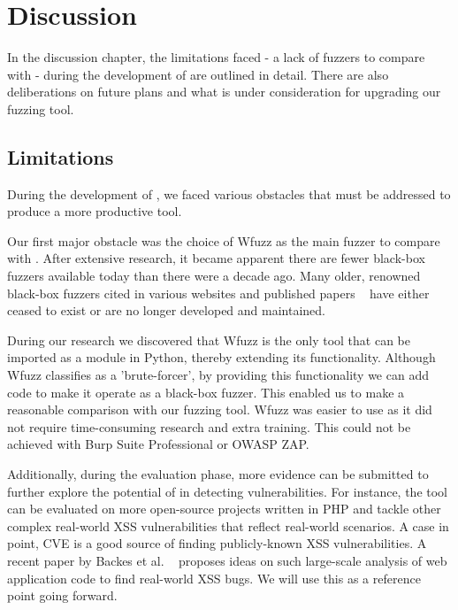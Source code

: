 \chapter{Discussion}
\label{sec:discussion}
\minitoc
\vspace*{1cm}

In the discussion chapter, the limitations faced - \ie a lack of fuzzers to compare with - during the development of \pname{} are outlined in detail. There are also deliberations on future plans and what is under consideration for upgrading our fuzzing tool.

\section{Limitations}
During the development of \pname{}, we faced various obstacles that must be addressed to produce a more productive tool.

Our first major obstacle was the choice of Wfuzz as the main fuzzer to compare with \pname{}. After extensive research, it became apparent there are fewer black-box fuzzers available today than there were a decade ago. Many older, renowned black-box fuzzers cited in various websites and published papers ~\cite{doupe2010johnny, bau2010state, duchene2014kameleonfuzz} have either ceased to exist or are no longer developed and maintained. 

During our research we discovered that Wfuzz is the only tool that can be imported as a module in Python, thereby extending its functionality. Although Wfuzz classifies as a 'brute-forcer', by providing this functionality we can add code to make it operate as a black-box fuzzer. This enabled us to make a reasonable comparison with our fuzzing tool. Wfuzz was easier to use as it did not require time-consuming research and extra training. This could not be achieved with Burp Suite Professional or OWASP ZAP.

Additionally, during the evaluation phase, more evidence can be submitted to further explore the potential of \pname{} in detecting vulnerabilities. For instance, the tool can be evaluated on more open-source projects written in PHP and tackle other complex real-world XSS vulnerabilities that reflect real-world scenarios. A case in point, CVE is a good source of finding publicly-known XSS vulnerabilities. A recent paper by Backes et al. ~\cite{efficient2017} proposes ideas on such large-scale analysis of web application code to find real-world XSS bugs. We will use this as a reference point going forward. 

